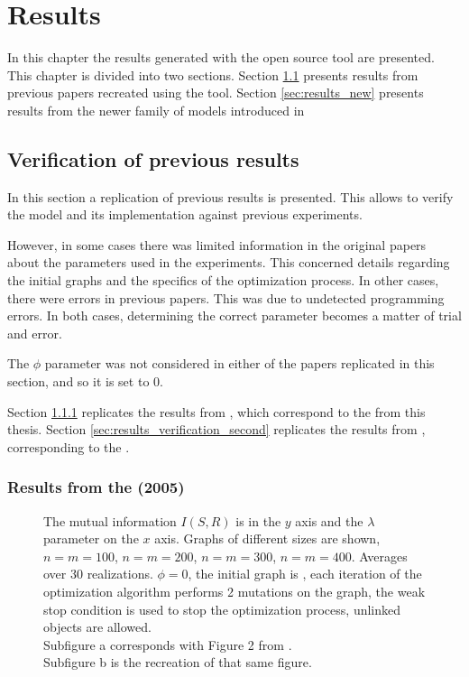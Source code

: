 \chapter{Results}
\label{cha:results}

In this chapter the results generated with the open source tool are presented.
This chapter is divided into two sections.
Section \ref{sec:results_verification} presents results from previous papers recreated using the tool.
Section \ref{sec:results_new} presents results from the newer family of models introduced in \cite{Ferrer2018a}

\section{Verification of previous results}
\label{sec:results_verification}

In this section a replication of previous results is presented.
This allows to verify the model and its implementation against previous experiments.

However, in some cases there was limited information in the original papers about the parameters used in the experiments.
This concerned details regarding the initial graphs and the specifics of the optimization process.
In other cases, there were errors in previous papers.
This was due to undetected programming errors.
In both cases, determining the correct parameter becomes a matter of trial and error.

The $\phi$ parameter was not considered in either of the papers replicated in this section, and so it is set to 0.

Section \ref{sec:results_verification_first} replicates the results from \cite{Ferrer2005a}, which correspond to the \firstmodel{} from this thesis.
Section \ref{sec:results_verification_second} replicates the results from \cite{Ferrer2003a}, corresponding to the \secondmodel{}.

\subsection{Results from the \firstmodel{} (2005)}
\label{sec:results_verification_first}

\begin{figure}
  \caption{
    The mutual information $I(S,R)$ is in the $y$ axis and the $\lambda$ parameter on the $x$ axis.
    Graphs of different sizes are shown, $n=m=100$, $n=m=200$, $n=m=300$, $n=m=400$.
    Averages over 30 realizations.
    $\phi=0$, the initial graph is , each iteration of the optimization algorithm performs 2 mutations on the graph, the weak stop condition is used to stop the optimization process, unlinked objects are allowed.\\
    Subfigure a corresponds with Figure 2 from \cite{Ferrer2005a}.\\
    Subfigure b is the recreation of that same figure.
  }
  \label{fig:fig2_2005}
\end{figure}

